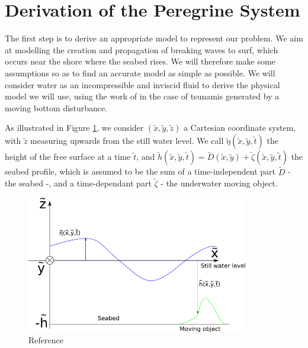 \documentclass[11pt,a4paper]{article}
\begin{document}
	\pagebreak
		
\section{Derivation of the Peregrine System}
	The first step is to derive an appropriate model to represent our problem. We aim at modelling the creation and propagation of breaking waves to surf, which occurs near the shore where the seabed rises. We will therefore make some assumptions so as to find an accurate model as simple as possible. We will consider water as an incompressible and inviscid fluid to derive the physical model we will use, using the work of \cite{DM2013} in the case of tsunamis generated by a moving bottom disturbance.
	
	As illustrated in Figure \ref{Coordinates}, we consider $(\tilde{x},\tilde{y},\tilde{z})$ a Cartesian coordinate system, with $\tilde{z}$ measuring upwards from the still water level. We call $\tilde{\eta}(\tilde{x},\tilde{y},\tilde{t})$ the height of the free surface at a time $\tilde{t}$, and $\tilde{h}(\tilde{x},\tilde{y},\tilde{t}) = \tilde{D}(\tilde{x},\tilde{y}) + \tilde{\zeta}(\tilde{x},\tilde{y}, \tilde{t})$ the seabed profile, which is assumed to be the sum of a time-independent part $\tilde{D}$ - the seabed -, and a time-dependant part $\tilde{\zeta}$ - the underwater moving object.
	\begin{figure}[h]
		\centering
		\includegraphics[height=6cm]{CartesianCoordinates.png}
		\caption{Reference}
		\label{Coordinates}
	\end{figure}
			
\end{document}
